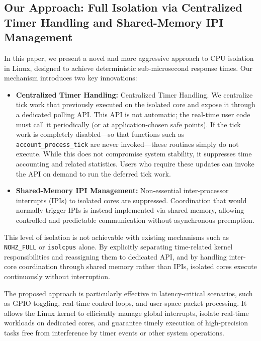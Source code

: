 \documentclass[letterpaper]{article}
\begin{document}
\subsection{Our Approach: Full Isolation via Centralized Timer Handling and Shared-Memory IPI Management}

In this paper, we present a novel and more aggressive approach to CPU isolation in Linux, 
designed to achieve deterministic sub-microsecond response times. 
Our mechanism introduces two key innovations:

\begin{itemize}
\item \textbf{Centralized Timer Handling:} Centralized Timer Handling. We centralize tick work that previously executed on the isolated core
  and expose it through a dedicated polling API. This API is not automatic; the real-time user code must call it periodically
  (or at application-chosen safe points). If the tick work is completely disabled—so that functions such as \texttt{account\_process\_tick} are
  never invoked—these routines simply do not execute. While this does not compromise system stability, it suppresses time accounting and related statistics.
  Users who require these updates can invoke the API on demand to run the deferred tick work.
    
    \item \textbf{Shared-Memory IPI Management:} Non-essential inter-processor interrupts (IPIs) to isolated cores 
    are suppressed. Coordination that would normally trigger IPIs is instead implemented via shared memory, 
    allowing controlled and predictable communication without asynchronous preemption.
\end{itemize}

This level of isolation is not achievable with existing mechanisms such as 
\texttt{NOHZ\_FULL} or \texttt{isolcpus} alone. 
By explicitly separating time-related kernel responsibilities and reassigning them to dedicated API, 
and by handling inter-core coordination through shared memory rather than IPIs, 
isolated cores execute continuously without interruption.  

The proposed approach is particularly effective in latency-critical scenarios, 
such as GPIO toggling, real-time control loops, and user-space packet processing. 
It allows the Linux kernel to efficiently manage global interrupts, 
isolate real-time workloads on dedicated cores, and guarantee timely execution 
of high-precision tasks free from interference by timer events or other system operations.
\end{document}

